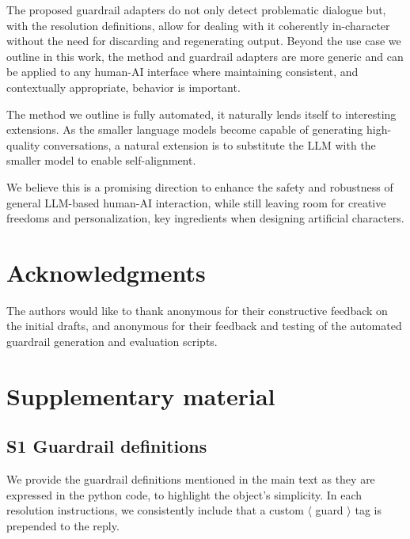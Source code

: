 \documentclass[letterpaper]{article}
\begin{document}
The proposed guardrail adapters do not only detect problematic dialogue but, with the resolution definitions, allow for dealing with it coherently in-character without the need for discarding and regenerating output. Beyond the use case we outline in this work, the method and guardrail adapters are more generic and can be applied to any human-AI interface where maintaining consistent, and contextually appropriate, behavior is important.  

The method we outline is fully automated, it naturally lends itself to interesting extensions. As the smaller language models become capable of generating high-quality conversations, a natural extension is to substitute the LLM with the smaller model to enable self-alignment.

We believe this is a promising direction to enhance the safety and robustness of general LLM-based human-AI interaction, while still leaving room for creative freedoms and personalization, key ingredients when designing artificial characters.


\section{Acknowledgments}
The authors would like to thank anonymous for their constructive feedback on the initial drafts, and anonymous for their feedback and testing of the automated guardrail generation and evaluation scripts. 

\footnotesize


    
\onecolumn
\appendix 
\section{Supplementary material}\label{app:appendix}
\subsection{S1 Guardrail definitions}\label{app:guardrail-definitions}
We provide the guardrail definitions mentioned in the main text as they are expressed in the python code, to highlight the object's simplicity. In each resolution instructions, we consistently include that a custom $\langle$ guard $\rangle$ tag is prepended to the reply. 
\end{document}
